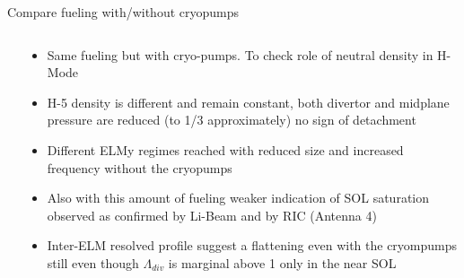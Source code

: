 \documentclass[10pt, compress]{beamer}
\newcommand\Fontvi{\fontsize{8}{7.2}\selectfont}
\begin{document}
\begin{frame}{Compare fueling with/without cryopumps}
\Fontvi
  \vspace{-1cm}
\begin{columns}
  \begin{column}{0.65\textwidth}
  \end{column}
  \begin{column}{0.35\textwidth}
    \begin{itemize}
    \item<1-> Same fueling but with cryo-pumps. \alert{To check role
        of neutral density in H-Mode}
      \item<1-> H-5 density is different and remain constant, both
        divertor and midplane pressure are reduced (to 1/3
        approximately) no sign of detachment
      \item<2-> Different ELMy regimes reached with reduced size and
        increased frequency without the cryopumps
      \item<3-> Also with this amount of fueling weaker indication of SOL
        saturation observed as confirmed by Li-Beam and by RIC (Antenna 4)
      \item<4> Inter-ELM resolved profile suggest a flattening even
        with the cryompumps still even though $\Lambda_{div}$ is
        marginal above 1 only in the near SOL
        
    \end{itemize}
  \end{column}
\end{columns}
\end{frame}
\end{document}
